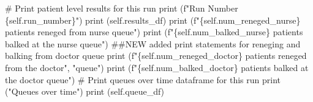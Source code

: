 \documentclass[
  letterpaper,
  DIV=11,
  numbers=noendperiod]{scrreprt}
\newenvironment{Shaded}{}{}
\newcommand{\BuiltInTok}[1]{\textcolor[rgb]{0.84,0.23,0.29}{#1}}
\newcommand{\CommentTok}[1]{\textcolor[rgb]{0.42,0.45,0.49}{#1}}
\newcommand{\NormalTok}[1]{\textcolor[rgb]{0.14,0.16,0.18}{#1}}
\newcommand{\SpecialCharTok}[1]{\textcolor[rgb]{0.00,0.36,0.77}{#1}}
\newcommand{\SpecialStringTok}[1]{\textcolor[rgb]{0.01,0.18,0.38}{#1}}
\newcommand{\StringTok}[1]{\textcolor[rgb]{0.01,0.18,0.38}{#1}}
\newcommand{\VariableTok}[1]{\textcolor[rgb]{0.89,0.38,0.04}{#1}}
\begin{document}
\begin{tcolorbox}
\begin{Shaded}
\begin{Highlighting}[]
        \CommentTok{\# Print patient level results for this run}
        \BuiltInTok{print}\NormalTok{ (}\SpecialStringTok{f"Run Number }\SpecialCharTok{\{}\VariableTok{self}\SpecialCharTok{.}\NormalTok{run\_number}\SpecialCharTok{\}}\SpecialStringTok{"}\NormalTok{)}
        \BuiltInTok{print}\NormalTok{ (}\VariableTok{self}\NormalTok{.results\_df)}
        \BuiltInTok{print}\NormalTok{ (}\SpecialStringTok{f"}\SpecialCharTok{\{}\VariableTok{self}\SpecialCharTok{.}\NormalTok{num\_reneged\_nurse}\SpecialCharTok{\}}\SpecialStringTok{ patients reneged from nurse queue"}\NormalTok{)}
        \BuiltInTok{print}\NormalTok{ (}\SpecialStringTok{f"}\SpecialCharTok{\{}\VariableTok{self}\SpecialCharTok{.}\NormalTok{num\_balked\_nurse}\SpecialCharTok{\}}\SpecialStringTok{ patients balked at the nurse queue"}\NormalTok{)}
        \CommentTok{\#\#NEW added print statements for reneging and balking from doctor queue}
        \BuiltInTok{print}\NormalTok{ (}\SpecialStringTok{f"}\SpecialCharTok{\{}\VariableTok{self}\SpecialCharTok{.}\NormalTok{num\_reneged\_doctor}\SpecialCharTok{\}}\SpecialStringTok{ patients reneged from the doctor"}\NormalTok{,}
               \StringTok{"queue"}\NormalTok{)}
        \BuiltInTok{print}\NormalTok{ (}\SpecialStringTok{f"}\SpecialCharTok{\{}\VariableTok{self}\SpecialCharTok{.}\NormalTok{num\_balked\_doctor}\SpecialCharTok{\}}\SpecialStringTok{ patients balked at the doctor queue"}\NormalTok{)}
        \CommentTok{\# Print queues over time dataframe for this run}
        \BuiltInTok{print}\NormalTok{ (}\StringTok{"Queues over time"}\NormalTok{)}
        \BuiltInTok{print}\NormalTok{ (}\VariableTok{self}\NormalTok{.queue\_df)}


\end{Highlighting}
\end{Shaded}
\end{tcolorbox}
\end{document}
